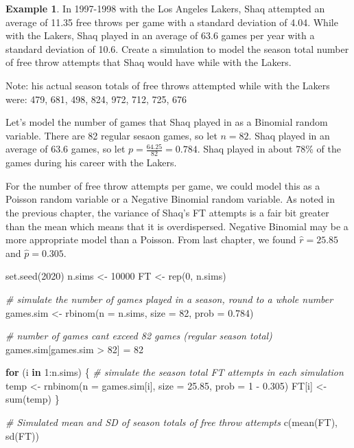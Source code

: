 \documentclass[
  11pt,
]{book}
\newenvironment{Shaded}{\begin{snugshade}}{\end{snugshade}}
\newcommand{\AttributeTok}[1]{\textcolor[rgb]{0.77,0.63,0.00}{#1}}
\newcommand{\CommentTok}[1]{\textcolor[rgb]{0.56,0.35,0.01}{\textit{#1}}}
\newcommand{\ControlFlowTok}[1]{\textcolor[rgb]{0.13,0.29,0.53}{\textbf{#1}}}
\newcommand{\DecValTok}[1]{\textcolor[rgb]{0.00,0.00,0.81}{#1}}
\newcommand{\FloatTok}[1]{\textcolor[rgb]{0.00,0.00,0.81}{#1}}
\newcommand{\FunctionTok}[1]{\textcolor[rgb]{0.00,0.00,0.00}{#1}}
\newcommand{\NormalTok}[1]{#1}
\newcommand{\OtherTok}[1]{\textcolor[rgb]{0.56,0.35,0.01}{#1}}
\newcommand{\SpecialCharTok}[1]{\textcolor[rgb]{0.00,0.00,0.00}{#1}}
\theoremstyle{definition}
\theoremstyle{definition}
\newtheorem{example}{Example}[chapter]
\theoremstyle{definition}
\theoremstyle{definition}
\theoremstyle{remark}
\begin{document}
\begin{example}
In 1997-1998 with the Los Angeles Lakers, Shaq attempted an average of 11.35 free throws per game with a standard deviation of 4.04. While with the Lakers, Shaq played in an average of 63.6 games per year with a standard deviation of 10.6. Create a simulation to model the season total number of free throw attempts that Shaq would have while with the Lakers.

Note: his actual season totals of free throws attempted while with the Lakers were: 479, 681, 498, 824, 972, 712, 725, 676
\end{example}

Let's model the number of games that Shaq played in as a Binomial random variable. There are 82 regular sesaon games, so let \(n=82\). Shaq played in an average of 63.6 games, so let \(p=\frac{64.25}{82}=0.784\). Shaq played in about 78\% of the games during his career with the Lakers.

For the number of free throw attempts per game, we could model this as a Poisson random variable or a Negative Binomial random variable. As noted in the previous chapter, the variance of Shaq's FT attempts is a fair bit greater than the mean which means that it is overdispersed. Negative Binomial may be a more appropriate model than a Poisson. From last chapter, we found \(\hat{r}=25.85\) and \(\hat{p}=0.305\).

\begin{Shaded}
\begin{Highlighting}[]
\FunctionTok{set.seed}\NormalTok{(}\DecValTok{2020}\NormalTok{)}
\NormalTok{n.sims }\OtherTok{\textless{}{-}} \DecValTok{10000}
\NormalTok{FT }\OtherTok{\textless{}{-}} \FunctionTok{rep}\NormalTok{(}\DecValTok{0}\NormalTok{, n.sims)}

\CommentTok{\# simulate the number of games played in a season, round to a whole number}
\NormalTok{games.sim }\OtherTok{\textless{}{-}} \FunctionTok{rbinom}\NormalTok{(}\AttributeTok{n =}\NormalTok{ n.sims, }\AttributeTok{size =} \DecValTok{82}\NormalTok{, }\AttributeTok{prob =} \FloatTok{0.784}\NormalTok{)}

\CommentTok{\# number of games can\textquotesingle{}t exceed 82 games (regular season total)}
\NormalTok{games.sim[games.sim }\SpecialCharTok{\textgreater{}} \DecValTok{82}\NormalTok{] }\OtherTok{=} \DecValTok{82}

\ControlFlowTok{for}\NormalTok{ (i }\ControlFlowTok{in} \DecValTok{1}\SpecialCharTok{:}\NormalTok{n.sims) \{}
    \CommentTok{\# simulate the season total FT attempts in each simulation}
\NormalTok{    temp }\OtherTok{\textless{}{-}} \FunctionTok{rnbinom}\NormalTok{(}\AttributeTok{n =}\NormalTok{ games.sim[i], }\AttributeTok{size =} \FloatTok{25.85}\NormalTok{, }\AttributeTok{prob =} \DecValTok{1} \SpecialCharTok{{-}} \FloatTok{0.305}\NormalTok{)}
\NormalTok{    FT[i] }\OtherTok{\textless{}{-}} \FunctionTok{sum}\NormalTok{(temp)}
\NormalTok{\}}

\CommentTok{\# Simulated mean and SD of season totals of free throw attempts}
\FunctionTok{c}\NormalTok{(}\FunctionTok{mean}\NormalTok{(FT), }\FunctionTok{sd}\NormalTok{(FT))}
\end{Highlighting}
\end{Shaded}
\end{document}
